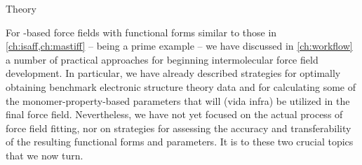 \begin{subsection}{Theory}

For \sapt-based force fields with functional forms similar to those in
\cref{ch:isaff,ch:mastiff} -- \mastiff being a prime example\footnotemark{} -- 
we have discussed in \cref{ch:workflow} a number of practical approaches for
beginning intermolecular force field development.
In particular, we have already described strategies for optimally obtaining benchmark
electronic structure theory data and for calculating some of the
monomer-property-based parameters
that will (vida infra) be utilized in the final force field. Nevertheless, 
we have not yet focused on the actual process of force field fitting, nor on
strategies for assessing the accuracy and transferability of the resulting
functional forms and parameters. It is
to these two crucial topics that we now turn.


\newcommand{\bij}{\textcolor{black}{B_{ij}}}
\newcommand{\bijr}{\bij r}


\end{subsection}
